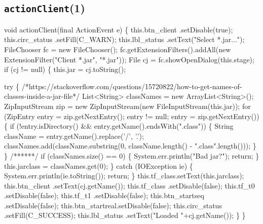 \subsection{\texttt{actionClient}(1)}
\nwenddocs{}\endmoddef{}
void actionClient(final ActionEvent e) \{
  this.btn_client   .setDisable(true);
  this.circ_status  .setFill(C_WARN);
  this.lbl_status   .setText("Select *.jar...");
  FileChooser fc = new FileChooser();
  fc.getExtensionFilters().addAll(new ExtensionFilter("Client *.jar", "*.jar"));
  File cj = fc.showOpenDialog(this.stage);
  if (cj != null) \{
    this.jar = cj.toString();

    try \{
/*https://stackoverflow.com/questions/15720822/how-to-get-names-of-classes-inside-a-jar-file*/
List<String> classNames = new ArrayList<String>();
ZipInputStream zip = new ZipInputStream(new FileInputStream(this.jar));
for (ZipEntry entry = zip.getNextEntry(); entry != null; entry = zip.getNextEntry()) \{
  if (!entry.isDirectory() && entry.getName().endsWith(".class")) \{
    String className = entry.getName().replace('/', '.');
    classNames.add(className.substring(0, className.length() - ".class".length()));
  \}
\}
/******/
      if (classNames.size() == 0) \{
        System.err.println("Bad jar?");
        return;
      \}
      this.jarclass = classNames.get(0);
    \} catch (IOException ie) \{
      System.err.println(ie.toString());
      return;
    \}
    this.tf_class.setText(this.jarclass);
    this.btn_client   .setText(cj.getName());
    this.tf_class     .setDisable(false);
    this.tf_t0        .setDisable(false);
    this.tf_t1        .setDisable(false);
    this.btn_startseq .setDisable(false);
    this.btn_startreal.setDisable(false);
    this.circ_status  .setFill(C_SUCCESS);
    this.lbl_status   .setText("Loaded "+cj.getName());
  \}
\}
\nwendcode{}\nwdocspar


